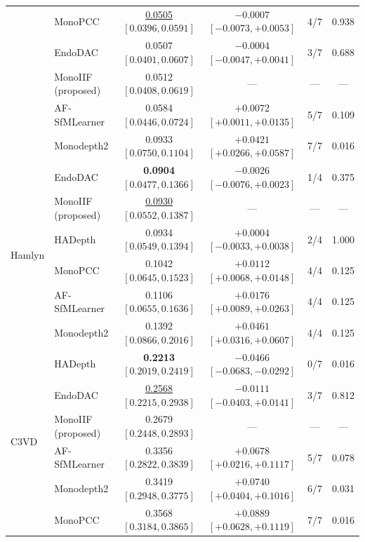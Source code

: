 \documentclass[a4paper,fleqn]{cas-dc}
\begin{document}
{\begin{table}[t]
\begin{tabular}{llcccc}
 & MonoPCC            & \underline{0.0505} $[0.0396, 0.0591]$ & $-0.0007$ $[-0.0073, +0.0053]$          & 4/7   & 0.938 \\
 & EndoDAC            & 0.0507 $[0.0401, 0.0607]$             & $-0.0004$ $[-0.0047, +0.0041]$          & 3/7   & 0.688 \\
 & MonoIIF (proposed) & 0.0512 $[0.0408, 0.0619]$             & ---                                     & ---   & ---   \\
 & AF-SfMLearner      & 0.0584 $[0.0446, 0.0724]$             & $\mathbf{+0.0072}$ $[+0.0011, +0.0135]$ & 5/7   & 0.109 \\
 & Monodepth2         & 0.0933 $[0.0750, 0.1104]$             & $\mathbf{+0.0421}$ $[+0.0266, +0.0587]$ & 7/7   & 0.016 \\
\midrule
\multirow{6}{*}{Hamlyn}
 & EndoDAC            & \textbf{0.0904} $[0.0477, 0.1366]$    & $-0.0026$ $[-0.0076, +0.0023]$          & 1/4   & 0.375 \\
 & MonoIIF (proposed) & \underline{0.0930} $[0.0552, 0.1387]$ & ---                                     & ---   & ---   \\
 & HADepth            & 0.0934 $[0.0549, 0.1394]$             & $+0.0004$ $[-0.0033, +0.0038]$          & 2/4   & 1.000 \\
 & MonoPCC            & 0.1042 $[0.0645, 0.1523]$             & $\mathbf{+0.0112}$ $[+0.0068, +0.0148]$ & 4/4   & 0.125 \\
 & AF-SfMLearner      & 0.1106 $[0.0655, 0.1636]$             & $\mathbf{+0.0176}$ $[+0.0089, +0.0263]$ & 4/4   & 0.125 \\
 & Monodepth2         & 0.1392 $[0.0866, 0.2016]$             & $\mathbf{+0.0461}$ $[+0.0316, +0.0607]$ & 4/4   & 0.125 \\
\midrule
\multirow{6}{*}{C3VD}
 & HADepth            & \textbf{0.2213} $[0.2019, 0.2419]$    & $\mathbf{-0.0466}$ $[-0.0683, -0.0292]$ & 0/7   & 0.016 \\
 & EndoDAC            & \underline{0.2568} $[0.2215, 0.2938]$ & $-0.0111$ $[-0.0403, +0.0141]$          & 3/7   & 0.812 \\
 & MonoIIF (proposed) & 0.2679 $[0.2448, 0.2893]$             & ---                                     & ---   & ---   \\
 & AF-SfMLearner      & 0.3356 $[0.2822, 0.3839]$             & $\mathbf{+0.0678}$ $[+0.0216, +0.1117]$ & 5/7   & 0.078 \\
 & Monodepth2         & 0.3419 $[0.2948, 0.3775]$             & $\mathbf{+0.0740}$ $[+0.0404, +0.1016]$ & 6/7   & 0.031 \\
 & MonoPCC            & 0.3568 $[0.3184, 0.3865]$             & $\mathbf{+0.0889}$ $[+0.0628, +0.1119]$ & 7/7   & 0.016 \\
\bottomrule
\end{tabular}
\end{table}

}
\end{document}
